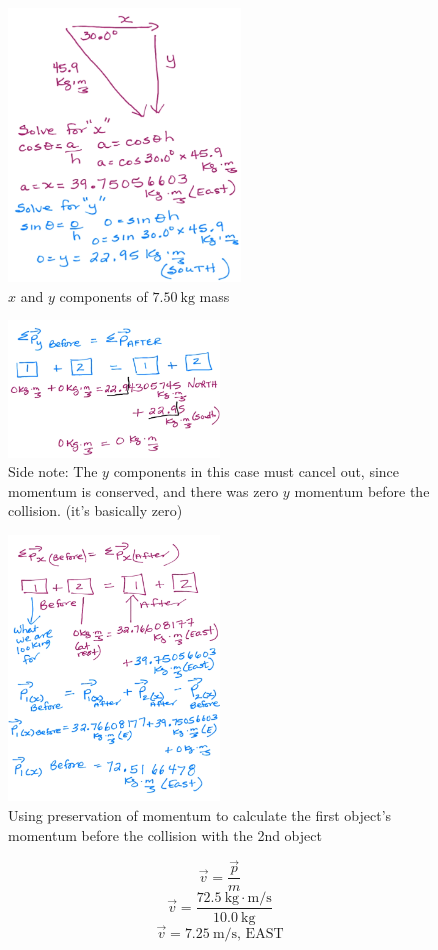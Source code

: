 \documentclass[a4paper,12pt]{article}
\begin{document}
\begin{figure}[H]
    \centering
    \caption{$x$ and $y$ components of $\SI{7.50}{\kg}$ mass}
    \includegraphics[width=0.55\textwidth]{q-glance-1c}
\end{figure}
\begin{figure}[H]
    \centering
    \caption{Side note: The $y$ components in this case must cancel out, since momentum is conserved, and there was zero $y$ momentum before the collision. (it's basically zero)}
    \includegraphics[width=0.50\textwidth]{q-glance-1d}
\end{figure}
\begin{figure}[H]
    \centering
    \caption{Using preservation of momentum to calculate the first object's momentum before the collision with the 2nd object}
    \includegraphics[width=0.50\textwidth]{q-glance-1e}
\end{figure}
$$\vec{v} = \frac{\vec{p}}{m}$$
$$\vec{v} = \frac{\SI{72.5}{\kg\cdot\m/\s}}{\SI{10.0}{\kg}}$$
$$\vec{v} = \SI{7.25}{\m/\s}\textrm{, EAST}$$
\end{document}
